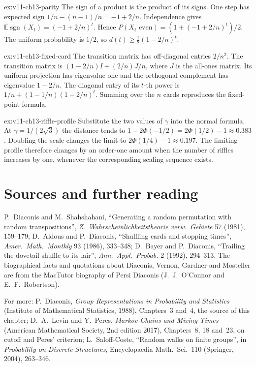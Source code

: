 \begin{solution}{ex:v11-ch13-parity}
\idea The sign of a product is the product of its signs.
\writeup One step has expected sign $1/n-(n-1)/n=-1+2/n$. Independence gives $\mathbb E\operatorname{sgn}(X_t)=(-1+2/n)^t$. Hence $P(X_t\text{ even})=(1+(-1+2/n)^t)/2$. The uniform probability is $1/2$, so $d(t)\ge\frac12(1-2/n)^t$.
\end{solution}

\begin{solution}{ex:v11-ch13-fixed-card}
\idea The transition matrix has off-diagonal entries $2/n^2$.
\writeup The transition matrix is $(1-2/n)I+(2/n)J/n$, where $J$ is the all-ones matrix. Its uniform projection has eigenvalue one and the orthogonal complement has eigenvalue $1-2/n$. The diagonal entry of its $t$-th power is $1/n+(1-1/n)(1-2/n)^t$. Summing over the $n$ cards reproduces the fixed-point formula.
\end{solution}

\begin{solution}{ex:v11-ch13-riffle-profile}
\idea Substitute the two values of $\gamma$ into the normal formula.
\writeup At $\gamma=1/(2\sqrt3)$ the distance tends to $1-2\Phi(-1/2)=2\Phi(1/2)-1\approx0.383$. Doubling the scale changes the limit to $2\Phi(1/4)-1\approx0.197$. The limiting profile therefore changes by an order-one amount when the number of riffles increases by one, whenever the corresponding scaling sequence exists.
\end{solution}

\section*{Sources and further reading}

P.~Diaconis and M.~Shahshahani, ``Generating a random permutation with random transpositions'', \emph{Z.\ Wahrscheinlichkeitstheorie verw.\ Gebiete} 57 (1981), 159--179; D.~Aldous and P.~Diaconis, ``Shuffling cards and stopping times'', \emph{Amer.\ Math.\ Monthly} 93 (1986), 333--348;
D.~Bayer and P.~Diaconis, ``Trailing the dovetail shuffle to its lair'', \emph{Ann.\ Appl.\ Probab.} 2 (1992), 294--313. The biographical facts and quotations about Diaconis, Vernon, Gardner and Mosteller are from the MacTutor biography of Persi Diaconis (J.~J.~O'Connor and E.~F.~Robertson).

For more: P.~Diaconis, \emph{Group Representations in Probability and Statistics} (Institute of Mathematical Statistics, 1988), Chapters~3 and~4, the source of this chapter; D.~A.~Levin and Y.~Peres, \emph{Markov Chains and Mixing Times} (American Mathematical Society, 2nd edition 2017), Chapters~8, 18 and~23, on
cutoff and Peres' criterion; L.~Saloff-Coste, ``Random walks on finite groups'', in \emph{Probability on Discrete Structures}, Encyclopaedia Math.\ Sci.\ 110 (Springer, 2004), 263--346.
